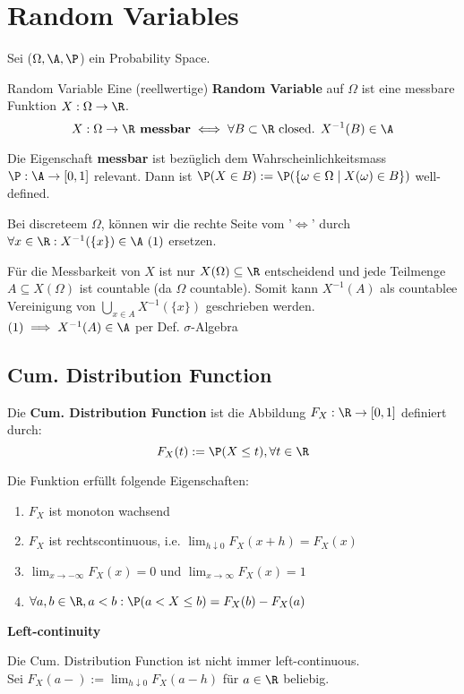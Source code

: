 \section{Random Variables}
Sei ($\Omega, \A, \P$) ein Probability Space.
\begin{mainbox}{Random Variable}
    Eine (reellwertige) \textbf{Random Variable} auf $\Omega$ ist eine messbare Funktion $X: \Omega \to \R$.
    $$X: \Omega \to \R \textbf{ messbar} \iff \forall B \subset \R \text { closed. } X^{-1}(B) \in \A$$
 
    Die Eigenschaft \textbf{messbar} ist bezüglich dem Wahrscheinlichkeitsmass $\P: \A \to [0,1]$ relevant. Dann ist $\P(X \in B) := \P(\{\omega \in \Omega \mid X(\omega) \in B\})$ well-defined.
\end{mainbox}
Bei discreteem $\Omega$, können wir die rechte Seite vom '$\iff$' durch $\forall x \in \R: X^{-1}(\{x\})\in \A \ (1)$ ersetzen. 

Für die Messbarkeit von $X$ ist nur $X(\Omega) \subseteq \R$ entscheidend und jede Teilmenge $A \subseteq X(\Omega)$ ist countable (da $\Omega$ countable). Somit kann $X^{-1}(A)$ als countablee Vereinigung von $\bigcup_{x \in A} X^{-1}(\{x\})$ geschrieben werden. 
\\$(1) \implies X^{-1}(A) \in \A$ per Def. $\sigma$-Algebra
\subsection{Cum. Distribution Function}
Die \textbf{Cum. Distribution Function} ist die Abbildung $F_X : \R \to [0,1]$ definiert durch:
$$F_X(t) := \P(X \leq t), \forall t \in \R$$

Die Funktion erfüllt folgende Eigenschaften:
\begin{enumerate}
    \item $F_X$ ist monoton wachsend 
    \item $F_X$ ist rechtscontinuous, i.e. $\lim_{h \downarrow 0}F_X(x+h) = F_X(x)$
    \item $\lim_{x \to -\infty}F_X(x) = 0$ und $\lim_{x \to \infty}F_X(x) = 1$
    \item $\forall a,b \in \R, a < b: \P(a < X \leq b) = F_X(b) -F_X(a)$ 
\end{enumerate}

\textbf{Left-continuity}

Die Cum. Distribution Function ist nicht immer left-continuous.
\\Sei $F_X(a-) := \lim_{h \downarrow 0}F_X(a-h)$ für $a \in \R$ beliebig.


